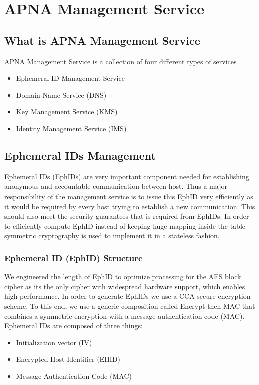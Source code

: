 
\chapter{APNA Management Service} %

\label{apnams} %

\section{What is APNA Management Service}
APNA Management Service is a collection of four different types of services

\begin{itemize}
    \item Ephemeral ID Management Service
    \item Domain Name Service (DNS)
    \item Key Management Service (KMS)
    \item Identity Management Service (IMS)
\end{itemize}

\section{Ephemeral IDs Management} \label{sec:apna_ms}
Ephemeral IDs (EphIDs) are very important component needed for establishing anonymous and accountable communication between host. Thus a major responsibility of the management service is to issue this EphID very efficiently as it would be required by every host trying to establish a new communication. This should also meet the security guarantees that is required from EphIDs. In order to efficiently compute EphID instead of keeping huge mapping inside the table symmetric cryptography is used to implement it in a stateless fashion.

\subsection{Ephemeral ID (EphID) Structure}
We engineered the length of EphID to optimize processing for the AES block cipher as its the only cipher with widespread hardware support, which enables high performance. In order to generate EphIDs we use a CCA-secure encryption scheme. To this end, we use a generic composition called Encrypt-then-MAC that combines a symmetric encryption with a message authentication code (MAC).
Ephemeral IDs are composed of three things:
\begin{itemize}
    \item Initialization vector (IV)
    \item Encrypted Host Identifier (EHID)
    \item Message Authentication Code (MAC)
\end{itemize}

